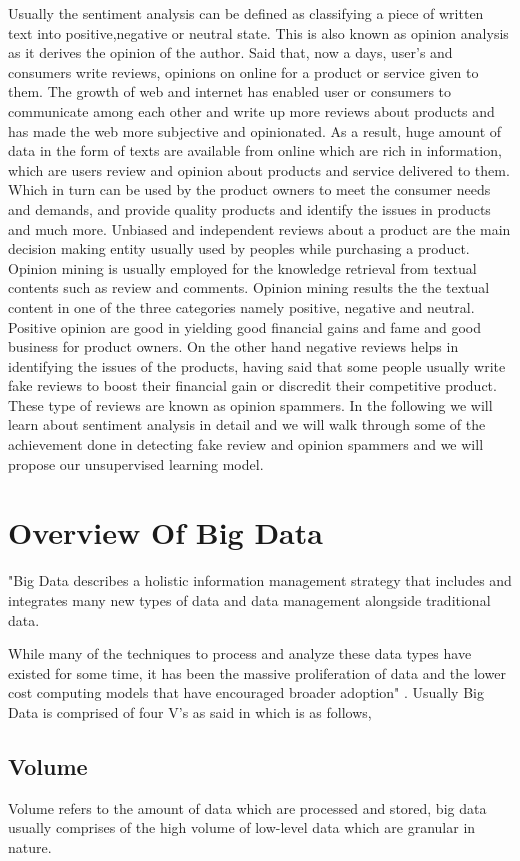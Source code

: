 \documentclass[sigconf]{acmart}
\begin{document}
Usually the sentiment analysis can be defined as classifying a piece of written text into positive,negative or neutral state. This is also known as opinion analysis as it derives the opinion of the author. Said that, now a days, user's and consumers write reviews, opinions on online for a product or service given to them. The growth of web and internet has enabled user or consumers to communicate among each other and write up more reviews about products and has made the web more subjective and opinionated. As a result, huge amount of data in the form of texts are available from online which are rich in information, which are users review and opinion about products and service delivered to them. Which in turn can be used by the product owners to meet the consumer needs and demands, and provide quality products and identify the issues in products and much more. Unbiased and independent reviews about a product are the main decision making entity usually used by peoples while purchasing a product. 
Opinion mining is usually employed for the knowledge retrieval from textual contents such as review and comments. Opinion mining results the the textual content in one of the three categories namely positive, negative and neutral. Positive opinion are good in yielding good financial gains and fame and good business for product owners. On the other hand negative reviews helps in identifying the issues of the products, having said that some people usually write fake reviews to boost their financial gain or discredit their competitive product. These type of reviews are known as opinion spammers. In the following we will learn about sentiment analysis in detail and we will walk through some of the achievement done in detecting fake review and opinion spammers and we will propose our unsupervised learning model.
\section{Overview Of Big Data}
"Big Data describes a holistic information management strategy that includes and integrates many new types of data and data management alongside traditional data. 

While many of the techniques to process and analyze these data types have existed for some time, it has been the massive proliferation of data and the lower cost computing models that have encouraged broader adoption" \cite{bigdatadef}. Usually Big Data is comprised of four V's as said in \cite{bigdatadef} which is as follows,
\subsection{Volume}
Volume refers to the amount of data which are processed and stored, big data usually comprises of the high volume of low-level data which are granular in nature.
\end{document}
